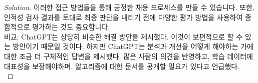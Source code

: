 \begin{proof} [Solution]
		이러한 접근 방법들을 통해 공정한 채용 프로세스를 만들 수 있습니다. 또한, 인적성 검사 결과를 토대로 최종 판단을 내리기 전에 다양한 평가 방법을 사용하여 종합적으로 평가하는 것도 중요합니다.\\
		
		비교: ChatGPT는 상당히 비슷한 해결 방안을 제시했다. 이것이 보편적으로 할 수 있는 방안이기 때문일 것이다. 하지만 ChatGPT는 분석과 개선을 어떻게 해야하는 가에 대한 조금 더 구체적인 답변을 제시했다. 많은 사람의 의견을 반영하고, 학습 데이터에 대표성을 보장해야하며, 알고리즘에 대한 문서를 공개할 필요가 있다고 언급했다.\\
	\end{proof}